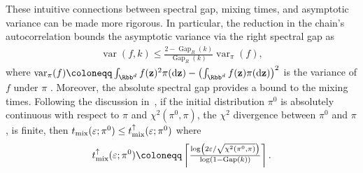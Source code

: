 \documentclass[onefignum,onetabnum]{siamonline250211}
\renewcommand{\d} {{\rm d}}                                %
\newcommand{\bfz}{{\bf z}}
\begin{document}
These intuitive connections between spectral gap, mixing times, and asymptotic variance can be made more rigorous. In particular, the reduction in the chain's autocorrelation bounds the asymptotic variance via the right spectral gap as
\begin{align*}
    \operatorname{var}(f,k) \le  \tfrac{2-\operatorname{Gap}_R(k)}{\operatorname{Gap}_R(k)}\operatorname{var}_\pi(f),
\end{align*}
where $\operatorname{var}_\pi(f)\coloneqq \int_{\Rbb^d}f(\bfz)^2\pi(\d\bfz)-\left(\int_{\Rbb^d}f(\bfz)\pi(\d\bfz)\right)^2$ is the variance of $f$ under $\pi$ \cite{douc_markov_2018, andrieu_explicit_2024}.
Moreover, the absolute spectral gap provides a bound to the mixing times.
Following the discussion in~\cite{andrieu_explicit_2024}, if the initial distribution $\pi^0$ is absolutely continuous with respect to $\pi$
%
and $\chi^2(\pi^0,\pi)$, the $\chi^2$ divergence between $\pi^0$ and $\pi$, is finite, then $t_{\rm mix}(\varepsilon; \pi^0) \leq t_{\rm mix}^\uparrow(\varepsilon; \pi^0)$ where
%
\begin{align*}
    t_{\rm mix}^\uparrow(\varepsilon;\pi^0) \coloneqq \left\lceil \tfrac{\log\left(2\varepsilon/\sqrt{\chi^2(\pi^0,\pi)}\right)}{\log(1-\text{Gap}(k))} \right\rceil.
\end{align*}
%

%
%
%
%
%
%
%
%
%
%
%
%
%
%
%
%
%
%
%
%
\end{document}
